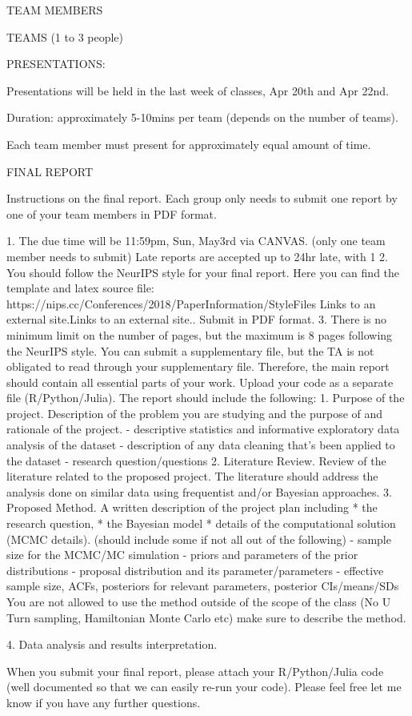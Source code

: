 TEAM MEMBERS

TEAMS (1 to 3 people)

PRESENTATIONS:

Presentations will be held in the last week of classes, Apr 20th and Apr 22nd.

Duration: approximately 5-10mins per team (depends on the number of teams).

Each team member must present for approximately equal amount of time.

FINAL REPORT

Instructions on the final report. Each group only needs to submit one report by one of your team members in PDF format. 

1. The due time will be 11:59pm, Sun, May3rd via CANVAS. (only one team member needs to submit)   
Late reports are accepted up to 24hr late, with 1%
2. You should follow the NeurIPS style for your final report. Here you can find the template and latex source file:   https://nips.cc/Conferences/2018/PaperInformation/StyleFiles Links to an external site.Links to an external site..
Submit in PDF format.
3. There is no minimum limit on the number of pages, but the maximum is 8 pages following the NeurIPS style. You can submit a supplementary file, but the TA is not obligated to read through your supplementary file. Therefore, the main report should contain all essential parts of your work. Upload your code as a separate file (R/Python/Julia).
The report should include the following:
1. Purpose of the project. Description of the problem you are studying and the purpose of and rationale of the project.
- descriptive statistics and informative exploratory data analysis of the dataset
- description of any data cleaning that's been applied to the dataset
- research question/questions
2. Literature Review. Review of the literature related to the proposed project. The literature should address the analysis done on similar data using frequentist and/or Bayesian approaches. 
3. Proposed Method. A written description of the project plan including
* the research question,
* the Bayesian model
* details of the computational solution (MCMC details). 
(should include some if not all out of the following)
  - sample size for the MCMC/MC simulation
  - priors and parameters of the prior distributions
  - proposal distribution and its parameter/parameters
  - effective sample size, ACFs, posteriors for relevant parameters, posterior CIs/means/SDs
You are not allowed to use the method outside of the scope of the class (No U Turn sampling, Hamiltonian Monte Carlo etc) make sure to describe the method.

4. Data analysis and results interpretation. 

When you submit your final report, please attach your R/Python/Julia code (well documented so that we can easily re-run your code). 
Please feel free let me know if you have any further questions. 